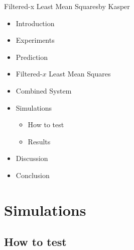 

\begin{frame}{Filtered-x Least Mean Squares}{by Kasper}
	\begin{itemize}
		\item[] Introduction
		\item[] Experiments
		\item[] Prediction
		\item[] Filtered-$x$ Least Mean Squares
		\item[] Combined System
		\item[] \textcolor{beamer@headercolor}{Simulations}
		\begin{itemize}
			\item[] \textcolor{beamer@headercolor}{How to test}
			\item[] \textcolor{beamer@headercolor}{Results}
		\end{itemize}
		\item[] \textcolor{beamer@headercolor}{Discussion}
		\item[] \textcolor{beamer@headercolor}{Conclusion}
	\end{itemize}
\end{frame}


\section{Simulations}
\subsection{How to test}

